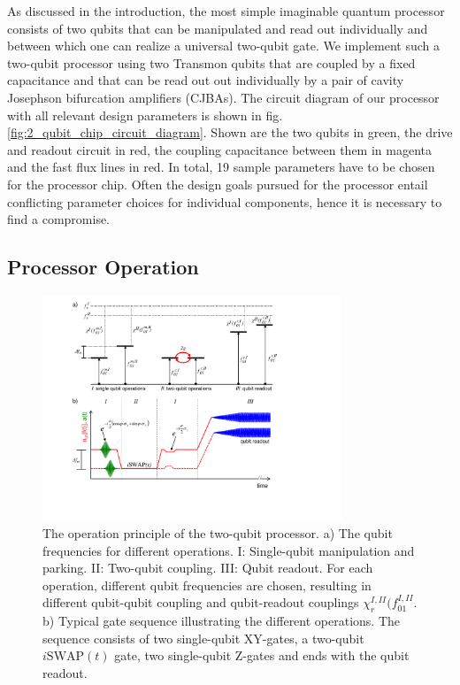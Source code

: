 As discussed in the introduction, the most simple imaginable quantum processor consists of two qubits that can be manipulated and read out individually and between which one can realize a universal two-qubit gate. We implement such a two-qubit processor using two Transmon qubits that are coupled by a fixed capacitance and that can be read out out individually by a pair of cavity Josephson bifurcation amplifiers (CJBAs). The circuit diagram of our processor with all relevant design parameters is shown in fig. \ref{fig:2_qubit_chip_circuit_diagram}. Shown are the two qubits in green, the drive and readout circuit in red, the coupling capacitance between them in magenta and the fast flux lines in red. In total, 19 sample parameters have to be chosen for the processor chip. Often the design goals pursued for the processor entail conflicting parameter choices for individual components, hence it is necessary to find a compromise.

\subsection{Processor Operation}

\begin{figure}[ht!]
	\centering
	\includegraphics[width=0.8\textwidth]{./material/figures/2-qubit-processor/processor_working_principle}
	\caption[...]{The operation principle of the two-qubit processor. a) The qubit frequencies for different operations. I: Single-qubit manipulation and parking. II: Two-qubit coupling. III: Qubit readout. For each operation, different qubit frequencies are chosen, resulting in different qubit-qubit coupling and qubit-readout couplings $\chi_r^{I,II}(f_{01}^{I,II}$. b) Typical gate sequence illustrating the different operations. The sequence consists of two single-qubit XY-gates, a two-qubit $i\mathrm{SWAP}(t)$ gate, two single-qubit Z-gates and ends with the qubit readout.}
	\label{fig:processor_operation}
\end{figure}

